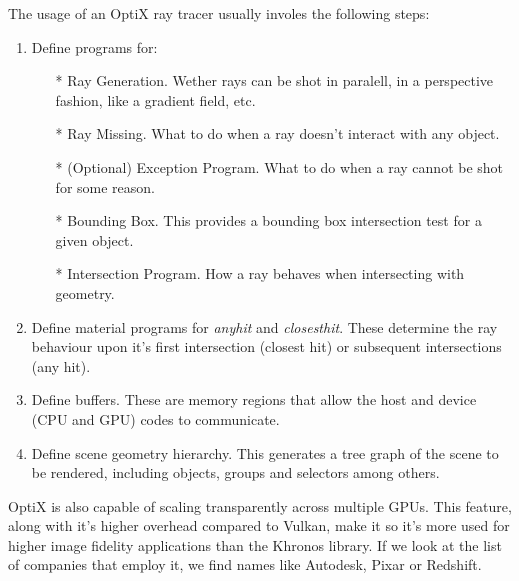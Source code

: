 The usage of an OptiX ray tracer usually involes the following steps:
\begin{enumerate}
  \item Define programs for:
  \begin{itemize}
    \item[*]{Ray Generation. Wether rays can be shot in paralell, in a perspective fashion, like a gradient field, etc.}
    \item[*]{Ray Missing. What to do when a ray doesn't interact with any object.}
    \item[*]{(Optional) Exception Program. What to do when a ray cannot be shot for some reason.}
    \item[*]{Bounding Box. This provides a bounding box intersection test for a given object.}
    \item[*]{Intersection Program. How a ray behaves when intersecting with geometry.}
  \end{itemize}
  \item Define material programs for \textit{anyhit} and \textit{closesthit}. These determine the ray behaviour upon it's first intersection (closest hit) or subsequent intersections (any hit).
  \item Define buffers. These are memory regions that allow the host and device (CPU and GPU) codes to communicate.
  \item Define scene geometry hierarchy. This generates a tree graph of the scene to be rendered, including objects, groups and selectors among others.
\end{enumerate}

OptiX is also capable of scaling transparently across multiple GPUs. This feature, along with it's higher overhead compared to Vulkan, make it so it's more used for higher image fidelity applications than the Khronos library. If we look at the list of companies that employ it, we find names like Autodesk, Pixar or Redshift.
